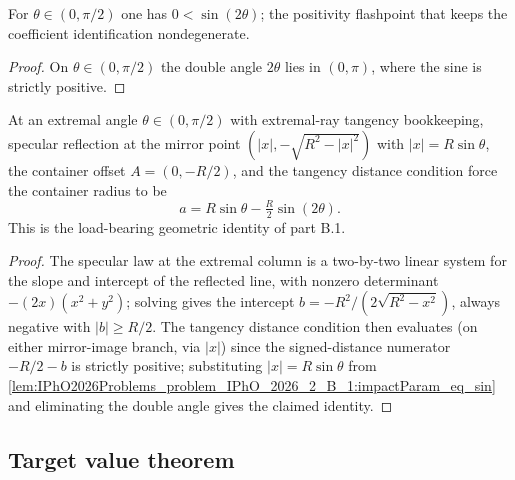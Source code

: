 \begin{lemma}
\label{lem:IPhO2026Problems_problem_IPhO_2026_2_B_1:sin_two_pos}
For $\theta \in (0, \pi/2)$ one has $0 < \sin(2\theta)$; the positivity
flashpoint that keeps the coefficient identification nondegenerate.
\end{lemma}
\begin{proof}
On $\theta \in (0, \pi/2)$ the double angle $2\theta$ lies in $(0, \pi)$,
where the sine is strictly positive.
\end{proof}

\begin{theorem}
\label{thm:IPhO2026Problems_problem_IPhO_2026_2_B_1:container_radius_at_extremal_angle}
At an extremal angle $\theta \in (0, \pi/2)$ with extremal-ray tangency
bookkeeping, specular reflection at the mirror point
$(|x|, -\sqrt{R^2 - |x|^2})$ with $|x| = R\sin\theta$, the container offset
$A = (0, -R/2)$, and the tangency distance condition force the container
radius to be
\[
a = R \sin\theta - \tfrac{R}{2}\sin(2\theta) .
\]
This is the load-bearing geometric identity of part B.1.
\end{theorem}
\begin{proof}
The specular law at the extremal column is a two-by-two linear system for
the slope and intercept of the reflected line, with nonzero determinant
$-(2x)(x^2 + y^2)$; solving gives the intercept
$b = -R^2/(2\sqrt{R^2 - x^2})$, always negative with $|b| \ge R/2$.
The tangency distance condition then evaluates (on either mirror-image
branch, via $|x|$) since the signed-distance numerator $-R/2 - b$ is
strictly positive; substituting $|x| = R\sin\theta$ from
\cref{lem:IPhO2026Problems_problem_IPhO_2026_2_B_1:impactParam_eq_sin}
and eliminating the double angle gives the claimed identity.
\end{proof}

\subsection*{Target value theorem}

